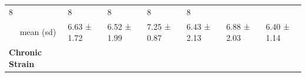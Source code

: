 \documentclass[
  english,
  man,floatsintext]{apa6}
\begin{document}
\begin{longtable}[]{@{}lllllll@{}}
\begin{minipage}[t]{0.11\columnwidth}
8\strut
\end{minipage} & \begin{minipage}[t]{0.11\columnwidth}\raggedright
8\strut
\end{minipage} & \begin{minipage}[t]{0.11\columnwidth}\raggedright
8\strut
\end{minipage} & \begin{minipage}[t]{0.11\columnwidth}\raggedright
8\strut
\end{minipage} & \begin{minipage}[t]{0.11\columnwidth}\raggedright
8\strut
\end{minipage}\tabularnewline
\begin{minipage}[t]{0.16\columnwidth}\raggedright
~~ mean (sd)\strut
\end{minipage} & \begin{minipage}[t]{0.11\columnwidth}\raggedright
6.63 ± 1.72\strut
\end{minipage} & \begin{minipage}[t]{0.11\columnwidth}\raggedright
6.52 ± 1.99\strut
\end{minipage} & \begin{minipage}[t]{0.11\columnwidth}\raggedright
7.25 ± 0.87\strut
\end{minipage} & \begin{minipage}[t]{0.11\columnwidth}\raggedright
6.43 ± 2.13\strut
\end{minipage} & \begin{minipage}[t]{0.11\columnwidth}\raggedright
6.88 ± 2.03\strut
\end{minipage} & \begin{minipage}[t]{0.11\columnwidth}\raggedright
6.40 ± 1.14\strut
\end{minipage}\tabularnewline
\begin{minipage}[t]{0.16\columnwidth}\raggedright
\textbf{Chronic Strain}\strut
\end{minipage} & \begin{minipage}[t]{0.11\columnwidth}\raggedright
~~\strut
\end{minipage} & \begin{minipage}[t]{0.11\columnwidth}\raggedright
~~\strut
\end{minipage} & \begin{minipage}[t]{0.11\columnwidth}\raggedright
~~\strut
\end{minipage} & \begin{minipage}[t]{0.11\columnwidth}\raggedright

\end{minipage}
\end{longtable}
\end{document}
